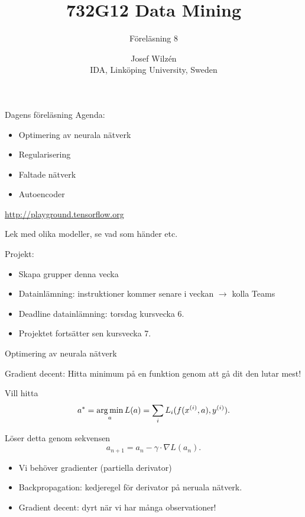 \documentclass[10pt,english]{beamer}
\title{732G12 Data Mining}
\subtitle{Föreläsning 8}
\date{}
\author{Josef Wilzén \\ IDA, Linköping University, Sweden}
\begin{document}
\maketitle

\begin{frame}{Dagens föreläsning}
    Agenda:
    \begin{itemize}
        \item Optimering av neurala nätverk
        \item Regularisering
        \item Faltade nätverk
        \item Autoencoder
    \end{itemize}

    \url{http://playground.tensorflow.org}

    Lek med olika modeller, se vad som händer etc.
    
    Projekt:
    \begin{itemize}
        \item Skapa grupper denna vecka
        \item Datainlämning: instruktioner kommer senare i veckan $\rightarrow$ kolla Teams
        \item Deadline datainlämning: torsdag kursvecka 6.
        \item Projektet fortsätter sen kursvecka 7.
    \end{itemize}
    
    
\end{frame}

\begin{frame}{Optimering av neurala nätverk}
    
    Gradient decent: Hitta minimum på en funktion genom att gå dit den lutar mest!

    Vill hitta
    \begin{equation*}
        a^* = \operatorname*{arg\,min}_a L(a) = \sum_i L_i(f(x^{(i)},a), y^{(i)}).
    \end{equation*}

    Löser detta genom sekvensen
    \begin{equation*}
        a_{n+1} = a_n - \gamma \cdot \nabla L(a_n).
    \end{equation*}

    \begin{itemize}
        \item Vi behöver gradienter (partiella derivator)
        \item Backpropagation: kedjeregel för derivator på neruala nätverk.
        \item Gradient decent: dyrt när vi har många observationer!
    \end{itemize}

\end{frame}
\end{document}
